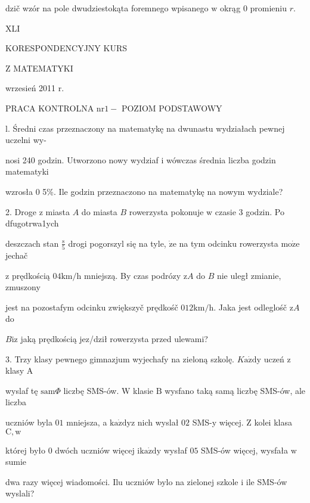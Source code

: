 \documentclass[a4paper,12pt]{article}
\begin{document}
dzič wzór na pole dwudziestokąta foremnego wpisanego $\mathrm{w}$ okrąg $0$ promieniu $r.$







XLI

KORESPONDENCYJNY KURS

Z MATEMATYKI

wrzesień 2011 r.

PRACA KONTROLNA $\mathrm{n}\mathrm{r} 1 -$ POZIOM PODSTAWOWY

l. Średni czas przeznaczony na matematykę na dwunastu wydziałach pewnej uczelni wy-

nosi 240 godzin. Utworzono nowy wydziaf $\mathrm{i}$ wówczas średnia liczba godzin matematyki

wzrosła $0$ 5\%. Ile godzin przeznaczono na matematykę na nowym wydziale?

2. Droge $\mathrm{z}$ miasta $A$ do miasta $B$ rowerzysta pokonuje $\mathrm{w}$ czasie 3 godzin. Po dfugotrwa1ych

deszczach stan $\displaystyle \frac{\mathrm{s}}{5}$ drogi pogorszyl się na tyle, $\dot{\mathrm{z}}\mathrm{e}$ na tym odcinku rowerzysta $\mathrm{m}\mathrm{o}\dot{\mathrm{z}}\mathrm{e}$ jechač

$\mathrm{z}$ prędkością $04\mathrm{k}\mathrm{m}/\mathrm{h}$ mniejszą. By czas podrózy $\mathrm{z}A$ do $B$ nie uległ zmianie, zmuszony

jest na pozostafym odcinku zwiększyč prędkośč $012\mathrm{k}\mathrm{m}/\mathrm{h}$. Jaka jest odleglośč $\mathrm{z}A$ do

$B\mathrm{i}\mathrm{z}$ jaką prędkością jez/dził rowerzysta przed ulewami?

3. Trzy klasy pewnego gimnazjum wyjechafy na zieloną szkolę. $K\mathrm{a}\dot{\mathrm{z}}\mathrm{d}\mathrm{y}$ uczeń $\mathrm{z}$ klasy $\mathrm{A}$

wyslaf tę $\mathrm{s}\mathrm{a}\mathrm{m}\Phi$ liczbę SMS-ów. $\mathrm{W}$ klasie $\mathrm{B}$ wysfano taką samą liczbę SMS-ów, ale liczba

uczniów byla $01$ mniejsza, a $\mathrm{k}\mathrm{a}\dot{\mathrm{z}}\mathrm{d}\mathrm{y}\mathrm{z}$ nich wyslał $02$ SMS-y więcej. $\mathrm{Z}$ kolei klasa $\mathrm{C}, \mathrm{w}$

której było $0$ dwóch uczniów więcej $\mathrm{i}\mathrm{k}\mathrm{a}\dot{\mathrm{z}}\mathrm{d}\mathrm{y}$ wysłaf $05$ SMS-ów więcej, wysfała $\mathrm{w}$ sumie

dwa razy więcej wiadomości. Ilu uczniów bylo na zielonej szkole $\mathrm{i}$ ile SMS-ów wyslali?
\end{document}
